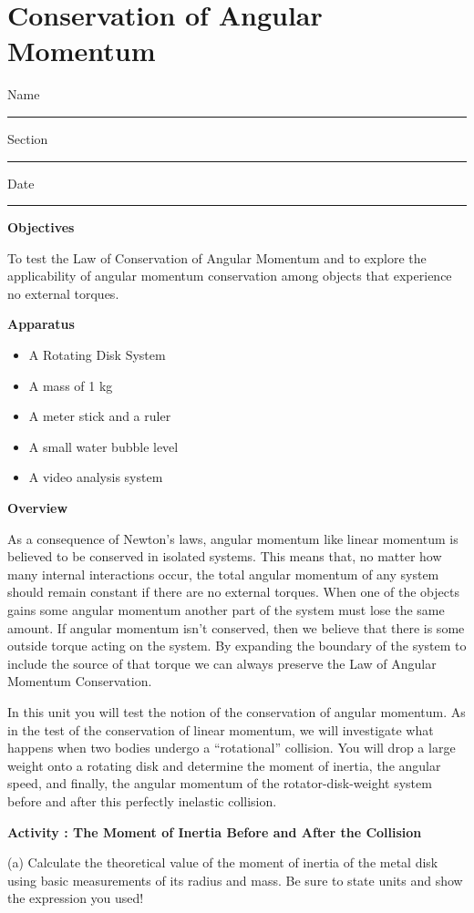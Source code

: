 
\section{Conservation of Angular Momentum}

Name \rule{2.0in}{0.1pt}\hfill{}Section \rule{1.0in}{0.1pt}\hfill{}Date \rule{1.0in}{0.1pt}

\textbf{Objectives} 

To test the Law of Conservation of Angular Momentum and to explore the applicability
of angular momentum conservation among objects that experience no external torques. 

\textbf{Apparatus}

\begin{itemize}
\item A Rotating Disk System 
\item A mass of 1 kg 
\item A meter stick and a ruler 
\item A small water bubble level
\item A video analysis system
\end{itemize}
\textbf{Overview }

As a consequence of Newton's laws, angular momentum like linear momentum is
believed to be conserved in isolated systems. This means that, no matter how
many internal interactions occur, the total angular momentum of any system should remain constant if there are no external torques. When one of the objects gains some angular momentum another part of the system must lose the same amount. If angular momentum isn't conserved, then we believe that there is some outside torque acting on the system. By expanding the boundary of the system to include the source of that torque we can always preserve the Law of Angular Momentum Conservation. 

In this unit you will test the notion of the conservation of angular momentum.
As in the test of the conservation of linear momentum, we will investigate what
happens when two bodies undergo a ``rotational'' collision.
You will drop a large weight onto a rotating disk and determine the moment of
inertia, the angular speed, and finally, the angular momentum of the rotator-disk-weight
system before and after this perfectly inelastic collision.

\textbf{Activity  : The Moment of Inertia Before and After the Collision}

(a) Calculate the theoretical value of the moment of inertia of the metal disk
using basic measurements of its radius and mass. Be sure to state units and
show the expression you used!
\vspace{5mm}


